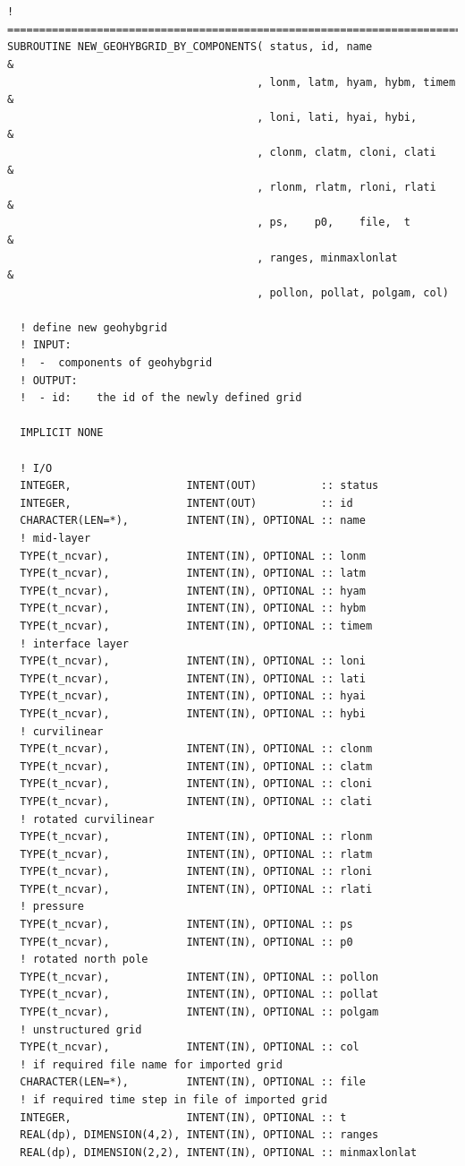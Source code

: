 \documentclass[11pt,twoside]{article}
\begin{document}
\begin{verbatim}


! ==================================================================================
SUBROUTINE NEW_GEOHYBGRID_BY_COMPONENTS( status, id, name              &
                                       , lonm, latm, hyam, hybm, timem &
                                       , loni, lati, hyai, hybi,       &
                                       , clonm, clatm, cloni, clati    & 
                                       , rlonm, rlatm, rloni, rlati    & 
                                       , ps,    p0,    file,  t        &
                                       , ranges, minmaxlonlat          &
                                       , pollon, pollat, polgam, col)

  ! define new geohybgrid
  ! INPUT: 
  !  -  components of geohybgrid
  ! OUTPUT:
  !  - id:    the id of the newly defined grid

  IMPLICIT NONE

  ! I/O
  INTEGER,                  INTENT(OUT)          :: status
  INTEGER,                  INTENT(OUT)          :: id
  CHARACTER(LEN=*),         INTENT(IN), OPTIONAL :: name
  ! mid-layer
  TYPE(t_ncvar),            INTENT(IN), OPTIONAL :: lonm
  TYPE(t_ncvar),            INTENT(IN), OPTIONAL :: latm
  TYPE(t_ncvar),            INTENT(IN), OPTIONAL :: hyam
  TYPE(t_ncvar),            INTENT(IN), OPTIONAL :: hybm
  TYPE(t_ncvar),            INTENT(IN), OPTIONAL :: timem
  ! interface layer
  TYPE(t_ncvar),            INTENT(IN), OPTIONAL :: loni
  TYPE(t_ncvar),            INTENT(IN), OPTIONAL :: lati
  TYPE(t_ncvar),            INTENT(IN), OPTIONAL :: hyai
  TYPE(t_ncvar),            INTENT(IN), OPTIONAL :: hybi
  ! curvilinear
  TYPE(t_ncvar),            INTENT(IN), OPTIONAL :: clonm
  TYPE(t_ncvar),            INTENT(IN), OPTIONAL :: clatm
  TYPE(t_ncvar),            INTENT(IN), OPTIONAL :: cloni
  TYPE(t_ncvar),            INTENT(IN), OPTIONAL :: clati
  ! rotated curvilinear
  TYPE(t_ncvar),            INTENT(IN), OPTIONAL :: rlonm
  TYPE(t_ncvar),            INTENT(IN), OPTIONAL :: rlatm
  TYPE(t_ncvar),            INTENT(IN), OPTIONAL :: rloni
  TYPE(t_ncvar),            INTENT(IN), OPTIONAL :: rlati
  ! pressure
  TYPE(t_ncvar),            INTENT(IN), OPTIONAL :: ps
  TYPE(t_ncvar),            INTENT(IN), OPTIONAL :: p0
  ! rotated north pole
  TYPE(t_ncvar),            INTENT(IN), OPTIONAL :: pollon
  TYPE(t_ncvar),            INTENT(IN), OPTIONAL :: pollat
  TYPE(t_ncvar),            INTENT(IN), OPTIONAL :: polgam
  ! unstructured grid
  TYPE(t_ncvar),            INTENT(IN), OPTIONAL :: col
  ! if required file name for imported grid
  CHARACTER(LEN=*),         INTENT(IN), OPTIONAL :: file
  ! if required time step in file of imported grid
  INTEGER,                  INTENT(IN), OPTIONAL :: t
  REAL(dp), DIMENSION(4,2), INTENT(IN), OPTIONAL :: ranges
  REAL(dp), DIMENSION(2,2), INTENT(IN), OPTIONAL :: minmaxlonlat


\end{verbatim}
\end{document}
